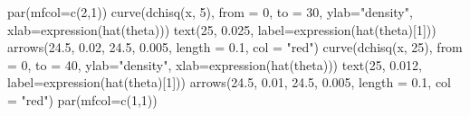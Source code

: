\begin{Schunk}
\begin{Sinput}
 par(mfcol=c(2,1))
 curve(dchisq(x, 5), from = 0, to = 30, ylab="density", xlab=expression(hat(theta)))
 text(25, 0.025, label=expression(hat(theta)[1]))
 arrows(24.5, 0.02, 24.5, 0.005, length = 0.1, col = "red")
 curve(dchisq(x, 25), from = 0, to = 40, ylab="density", xlab=expression(hat(theta)))
 text(25, 0.012, label=expression(hat(theta)[1]))
 arrows(24.5, 0.01, 24.5, 0.005, length = 0.1, col = "red")
 par(mfcol=c(1,1))
\end{Sinput}
\end{Schunk}
